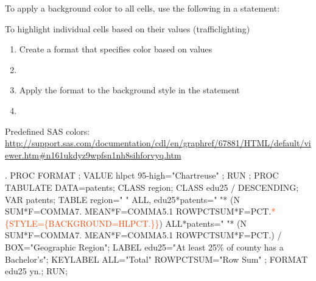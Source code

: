 \begin{frame}
\bi
\item
To apply a background color to all cells, use the following in a  statement:
\item
To highlight individual cells based on their values (trafficlighting)
\begin{enumerate}
\item Create a format that specifies color based on values
\item[] 
\item Apply the format to the background style in the  statement
\item[]
\end{enumerate}
\item
Predefined SAS colors: \url{http://support.sas.com/documentation/cdl/en/graphref/67881/HTML/default/viewer.htm\#n161ukdyz9wpfsn1nh8sihforvyq.htm}
\ei
\end{frame}

\begin{frame}[fragile]
\hspace{-0.3in}
\begin{code}{.}
PROC FORMAT ;  VALUE hlpct 95-high="Chartreuse" ; RUN ;
PROC TABULATE DATA=patents;
CLASS region; 
CLASS edu25 / DESCENDING;
VAR patents;
TABLE region=" "  ALL,
edu25*patents=" "*
  (N SUM*F=COMMA7. 
   MEAN*F=COMMA5.1 
   ROWPCTSUM*F=PCT.\textcolor{OrangeRed}{*\{STYLE=\{BACKGROUND=HLPCT.\}\}})
ALL*patents=" "*
  (N SUM*F=COMMA7. MEAN*F=COMMA5.1 ROWPCTSUM*F=PCT.) /
BOX="Geographic Region";
LABEL edu25="At least 25\% of county has a Bachelor's";
KEYLABEL ALL="Total" ROWPCTSUM="Row Sum" ; 
FORMAT edu25 yn.;
RUN;
\end{code}
\emp
\end{frame}

